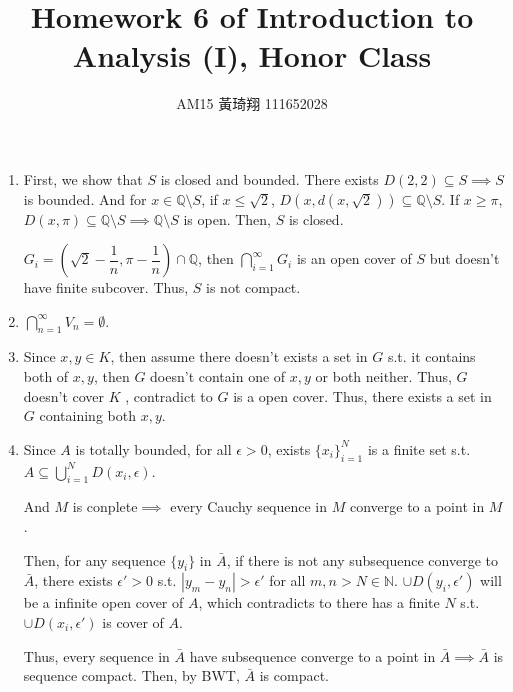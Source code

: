 \documentclass[12pt]{article}
\title{Homework 6 of Introduction to Analysis (I), Honor Class}
\author{AM15 黃琦翔 111652028}
\begin{document}
\maketitle
\begin{enumerate}
    \item First, we show that $S$ is closed and bounded. There exists $D(2, 2) \subseteq S\implies S$ is bounded.
    And for $x\in \mathbb{Q}\setminus S$, if $x\leq \sqrt{2}$, $D(x, d(x, \sqrt{2}))\subseteq \mathbb{Q}\setminus S$. If $x\geq \pi$, $D(x, \pi) \subseteq \mathbb{Q}\setminus S\implies \mathbb{Q}\setminus S$ is open.
    Then, $S$ is closed.

    $G_i = (\sqrt{2} - \dfrac{1}{n}, \pi - \dfrac{1}{n}) \cap \mathbb{Q}$, then $\displaystyle\bigcap_{i=1}^{\infty} G_i$ is an open cover of $S$ but doesn't have finite subcover.
    Thus, $S$ is not compact.

    \item $\displaystyle\bigcap_{n=1}^{\infty} V_n = \emptyset$.
    
    \item Since $x, y\in K$, then assume there doesn't exists a set in $G$ s.t. it contains both of $x, y$, then $G$ doesn't contain one of $x, y$ or both neither.
    Thus, $G$ doesn't cover $K$ , contradict to $G$ is a open cover. Thus, there exists a set in $G$ containing both $x, y$.

    \item Since $A$ is totally bounded, for all $\epsilon > 0$, exists $\lbrace x_i\rbrace_{i=1}^N$ is a finite set s.t. $A \subseteq \displaystyle\bigcup_{i=1}^N D(x_i, \epsilon)$.
    
    And $M$ is conplete$\implies$ every Cauchy sequence in $M$ converge to a point in $M$.

    Then, for any sequence $\lbrace y_i\rbrace$ in $\bar{A}$, if there is not any subsequence converge to $\bar{A}$, there exists $\epsilon' > 0$ s.t. $|y_m-y_n| > \epsilon'$ for all $m, n > N\in \mathbb{N}$.
    $\cup D(y_i, \epsilon')$ will be a infinite open cover of $A$, which contradicts to there has a finite $N$ s.t. $\cup D(x_i, \epsilon')$ is cover of $A$.

    Thus, every sequence in $\bar{A}$ have subsequence converge to a point in $\bar{A}\implies \bar{A}$ is sequence compact.
    Then, by BWT, $\bar{A}$ is compact.
\end{enumerate}
\end{document}
